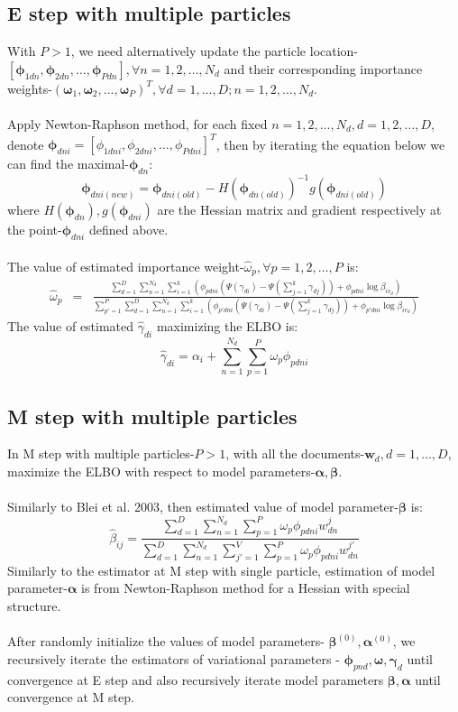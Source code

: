 \documentclass{article}
\newcommand{\be}{\begin{equation}}
\newcommand{\ee}{\end{equation}}
\newcommand{\bs}{\boldsymbol}
\newcommand{\ba}{\begin{array}}
\newcommand{\ea}{\end{array}}
\begin{document}
\subsection{E step with multiple particles}
With $P>1$, we need alternatively update the particle location-$[\bs{\phi}_{1dn},\bs{\phi}_{2dn},\ldots,\bs{\phi}_{Pdn}],\forall n=1,2,\ldots,N_d$ and their corresponding importance weights-$(\bs{\omega}_{1},\bs{\omega}_{2},\ldots,\bs{\omega}_{P})^T,\forall d=1,\ldots,D;n=1,2,\ldots,N_d$.\\
\\
Apply Newton-Raphson method, for each fixed $n=1,2,\ldots,N_d,d=1,2,\ldots,D$, denote $\bs{\phi}_{dni}=[\phi_{1dni},\phi_{2dni},\ldots,\phi_{Pdni}]^T$, then by iterating the equation below we can find the maximal-$\bs{\phi}_{dn}$:\\
\[
\bs{\phi}_{dni(new)}=\bs{\phi}_{dni(old)}-H(\bs{\phi}_{dn(old)})^{-1}g(\bs{\phi}_{dni(old)})
\]
where $H(\bs{\phi}_{dn}),g(\bs{\phi}_{dni})$ are the Hessian matrix and gradient respectively at the point-$\bs{\phi}_{dni}$ defined above.\\
\\
The value of estimated importance weight-$\hat{\omega}_p,\forall p=1,2,\ldots,P$ is:
\be\label{omg3}
\ba{rcl}
\hat{\omega}_p
&=&\frac{\sum_{d=1}^{D}\sum_{n=1}^{N_d}\sum_{i=1}^{k}\left(\phi_{pdni}(\Psi(\gamma_{di})-\Psi(\sum_{j=1}^{k}\gamma_{dj}))+\phi_{pdni}\log\beta_{iv_d}\right)}{\sum_{p'=1}^{P}\sum_{d=1}^{D}\sum_{n=1}^{N_d}\sum_{i=1}^{k}\left(\phi_{p'dni}(\Psi(\gamma_{di})-\Psi(\sum_{j=1}^{k}\gamma_{dj}))+\phi_{p'dni}\log\beta_{iv_d}\right)}
\ea
\ee
The value of estimated $\hat{\gamma}_{di}$ maximizing the ELBO is:\\
\[
\hat{\gamma}_{di}=\alpha_i+\sum_{n=1}^{N_d}\sum_{p=1}^{P}\omega_{p}\phi_{pdni}
\]
\subsection{M step with multiple particles}
In M step with multiple particles-$P>1$, with all the documents-$\bs{w}_d,d=1,\ldots,D$, maximize the  ELBO with respect to model parameters-$\bs{\alpha,}\bs{\beta}$.\\
\\
Similarly to Blei et al. 2003, then estimated value of model parameter-$\bs{\beta}$ is:\\
\[
\hat{\beta}_{ij}=\frac{\sum_{d=1}^{D}\sum_{n=1}^{N_d}\sum_{p=1}^{P}\omega_{p}\phi_{pdni}w_{dn}^j}{\sum_{d=1}^{D}\sum_{n=1}^{N_d}\sum_{j'=1}^{V}\sum_{p=1}^{P}\omega_{p}\phi_{pdni}w_{dn}^{j'}}
\]
Similarly to the estimator at M step with single particle, estimation of model parameter-$\bs{\alpha}$ is from Newton-Raphson method for a Hessian with special structure.\\
\\
After randomly initialize the values of model parameters- $\bs{\beta}^{(0)},\bs{\alpha}^{(0)}$, we recursively iterate the estimators of variational parameters - $\bs{\phi}_{pnd}, \bs{\omega}, \bs{\gamma}_d$ until convergence at E step and also recursively iterate model parameters $\bs{\beta},\bs{\alpha}$ until convergence at M step.
\newpage
\end{document}
